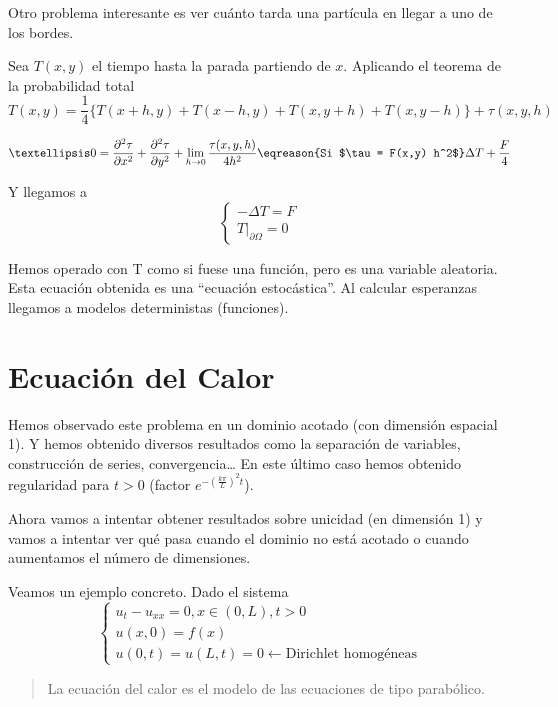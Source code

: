 \begin{example}
		Otro problema interesante es ver cuánto tarda una partícula en llegar a uno de los bordes.

		\noindent Sea $T(x,y)$ el tiempo hasta la parada partiendo de $x$. Aplicando el teorema de la probabilidad total
		\[ T(x,y) = \frac{1}{4} \{ T(x+h,y) + T(x-h,y) + T(x,y+h) + T(x,y-h) \} + \tau(x,y,h)\]

		\[ … 0 = \frac{\partial^2\tau}{\partial x^2} + \frac{\partial^2 \tau}{\partial y^2} + \lim_{h \to 0} \frac{\tau(x,y,h)}{4h^2} \eqreason{Si $\tau = F(x,y) h^2$} \Delta T + \frac{F}{4} \]

		Y llegamos a
		\[ \begin{cases}
			-\Delta T = F \\
			T |_{\partial \Omega} = 0
		\end{cases}\]
		\end{example}
		\obs Hemos operado con T como si fuese una función, pero es una variable aleatoria. Esta ecuación obtenida es una ``ecuación estocástica''. Al calcular esperanzas llegamos a modelos deterministas (funciones).


\newpage %
\section{Ecuación del Calor}

	Hemos observado este problema en un dominio acotado (con dimensión espacial 1). Y hemos obtenido diversos resultados como la separación de variables, construcción de series, convergencia… En este último caso hemos obtenido regularidad para $t > 0$ (factor $e^{-\left(\frac{k \pi}{L}\right)^2 t}$).

	Ahora vamos a intentar obtener resultados sobre unicidad (en dimensión 1) y vamos a intentar ver qué pasa cuando el dominio no está acotado o cuando aumentamos el número de dimensiones.

	Veamos un ejemplo concreto. Dado el sistema \[ \begin{cases}
		u_{t} - u_{xx} = 0, x \in (0,L), t > 0 \\
		u(x,0) = f(x) \\
		u(0,t) = u(L,t) = 0 \leftarrow \text{Dirichlet homogéneas}
	 \end{cases}\]

	 \begin{quote}
		La ecuación del calor es el modelo de las ecuaciones de tipo parabólico.
	 \end{quote}

